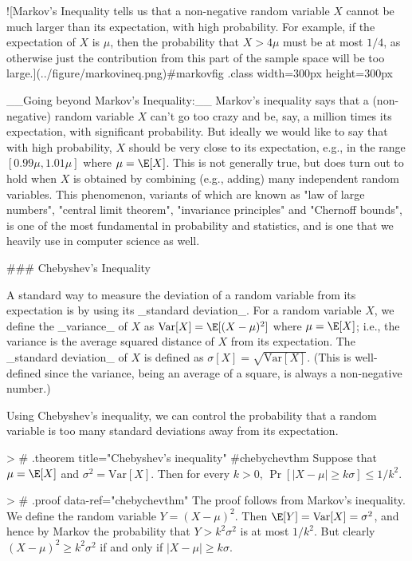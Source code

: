 ![Markov's Inequality tells us that a non-negative random variable $X$ cannot be much larger than its expectation, with high probability. For example, if the expectation of $X$ is $\mu$, then the probability that $X>4\mu$ must be at most $1/4$, as otherwise just the contribution from this part of the sample space will be too large.](../figure/markovineq.png){#markovfig .class width=300px height=300px}


__Going beyond Markov's Inequality:__
Markov's inequality says that a (non-negative) random variable $X$ can't go too crazy and be, say, a million times its expectation, with significant probability.
But ideally we would like to say that with high probability, $X$ should be very close to its expectation, e.g., in the range $[0.99 \mu, 1.01 \mu]$ where $\mu = \E[X]$.
This is not generally true, but does turn out to hold when $X$ is obtained by combining (e.g., adding)  many independent random variables.
This phenomenon, variants of which are known as  "law of large numbers", "central limit theorem", "invariance principles" and "Chernoff bounds", is one of the most fundamental in probability and statistics, and is one that we heavily use in computer science as well.

### Chebyshev's Inequality

A standard way to  measure the deviation of a random variable from its expectation is by using its _standard deviation_.
For a random variable $X$, we define the _variance_ of $X$ as  $\mathrm{Var}[X] = \E[(X-\mu)^2]$ where $\mu = \E[X]$; i.e., the variance is the average squared distance of $X$ from its expectation.
The _standard deviation_ of $X$ is defined as $\sigma[X] = \sqrt{\mathrm{Var}[X]}$.
(This is well-defined since the variance, being an average of a square, is always a non-negative number.)

Using Chebyshev's inequality, we can control the probability that a random variable is too many standard deviations away from its expectation.

> # {.theorem title="Chebyshev's inequality" #chebychevthm}
Suppose that $\mu=\E[X]$ and $\sigma^2 = \mathrm{Var}[X]$.
Then for every $k>0$, $\Pr[ |X-\mu | \geq k \sigma ] \leq 1/k^2$.

> # {.proof data-ref="chebychevthm"}
The proof follows from Markov's inequality.
We define the random variable $Y = (X-\mu)^2$.
Then $\E[Y] = \mathrm{Var}[X] = \sigma^2$, and hence by Markov the probability that $Y > k^2\sigma^2$ is at most $1/k^2$.
But clearly $(X-\mu)^2 \geq k^2\sigma^2$ if and only if $|X-\mu| \geq k\sigma$.




